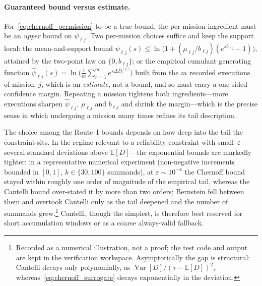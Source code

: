 \documentclass[11pt,a4paper]{article}
\theoremstyle{plain}
\theoremstyle{definition}
\theoremstyle{remark}
\begin{document}
\paragraph{Guaranteed bound versus estimate.}
For~\eqref{eq:chernoff_permission} to be a true bound, the per-mission ingredient must be an \emph{upper} bound on $\psi_{\ell j}$.
Two per-mission choices suffice and keep the support local: the mean-and-support bound $\psi_{\ell j}(s) \le \ln\!\big( 1 + (\mu_{\ell j}/b_{\ell j})(e^{s b_{\ell j}} - 1) \big)$, attained by the two-point law on $\{0, b_{\ell j}\}$; or the empirical cumulant generating function $\widehat\psi_{\ell j}(s) = \ln\!\big( \tfrac{1}{m} \sum_{r=1}^{m} e^{s \Delta D^{(j)}_r} \big)$ built from the $m$ recorded executions of mission~$j$, which is an \emph{estimate}, not a bound, and so must carry a one-sided confidence margin.
Repeating a mission tightens both ingredients---more executions sharpen $\widehat\psi_{\ell j}$, $\mu_{\ell j}$ and $b_{\ell j}$ and shrink the margin---which is the precise sense in which undergoing a mission many times refines its tail description.

The choice among the Route~I bounds depends on how deep into the tail the constraint sits.
In the regime relevant to a reliability constraint with small~$\varepsilon$---several standard deviations above $\mathbb{E}[D]$---the exponential bounds are markedly tighter: in a representative numerical experiment (non-negative increments bounded in $[0,1]$, $k \in \{30,100\}$ summands), at $\varepsilon \sim 10^{-4}$ the Chernoff bound stayed within roughly one order of magnitude of the empirical tail, whereas the Cantelli bound over-stated it by more than two orders; Bernstein fell between them and overtook Cantelli only as the tail deepened and the number of summands grew.\footnote{Recorded as a numerical illustration, not a proof; the test code and output are kept in the verification workspace. Asymptotically the gap is structural: Cantelli decays only polynomially, as $\operatorname{Var}[D]/(\tau-\mathbb{E}[D])^2$, whereas~\eqref{eq:chernoff_surrogate} decays exponentially in the deviation.}
Cantelli, though the simplest, is therefore best reserved for short accumulation windows or as a coarse always-valid fallback.
\end{document}
